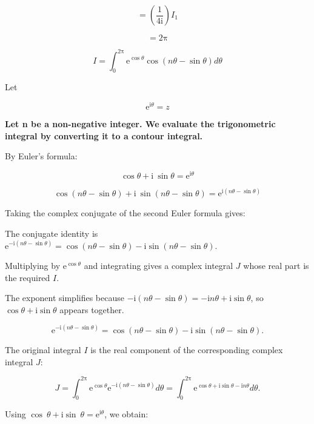 \documentclass[11pt,a4paper]{article}
\theoremstyle{definition}
\theoremstyle{plain}
\begin{document}
\[
= \left(\frac{1}{4\mathrm{i}}\right)I_{1}
\]

\[
= 2\mathrm{\pi}
\]

\[
I = \int_{0}^{2\mathrm{\pi}}\mathrm{e}^{\cos \theta}\cos(n\theta - \sin \theta)d\theta
\]

Let

\begin{equation}
\mathrm{e}^{\mathrm{i}\theta} = z
\end{equation}

\textbf{Let n be a non-negative integer. We evaluate the trigonometric integral by converting it to a contour integral.}

By Euler’s formula:

\begin{equation}
\cos \theta + \mathrm{i}\ \sin \theta = \mathrm{e}^{\mathrm{i}\theta}
\end{equation}

\[
\cos(n\theta - \sin \theta) + \mathrm{i}\ \sin(n\theta - \sin \theta) = \mathrm{e}^{\mathrm{i}(n\theta - \sin \theta)}
\]

Taking the complex conjugate of the second Euler formula gives:

The conjugate identity is $\mathrm{e}^{-\mathrm{i}(n\theta - \sin \theta)} = \cos(n\theta - \sin \theta) - \mathrm{i}\sin(n\theta - \sin \theta)$.

Multiplying by $\mathrm{e}^{\cos \theta}$ and integrating gives a complex integral $J$ whose real part is the required $I$.

The exponent simplifies because $-\mathrm{i}(n\theta - \sin \theta) = -\mathrm{i}n\theta + \mathrm{i}\sin \theta$, so $\cos \theta + \mathrm{i}\sin \theta$ appears together.

\begin{equation}
\mathrm{e}^{-\mathrm{i}(n\theta - \sin \theta)} = \cos(n\theta - \sin \theta) - \mathrm{i}\sin(n\theta - \sin \theta).
\end{equation}

The original integral $I$ is the real component of the corresponding complex integral $J$:

\begin{equation}
J = \int_{0}^{2\mathrm{\pi}}\mathrm{e}^{\cos \theta}\mathrm{e}^{-\mathrm{i}(n\theta - \sin \theta)} d\theta = \int_{0}^{2\mathrm{\pi}}\mathrm{e}^{\cos \theta + \mathrm{i}\sin \theta - \mathrm{i}n\theta} d\theta .
\end{equation}

Using $\cos \ \theta + \mathrm{i}\sin \ \theta = \mathrm{e}^{\mathrm{i}\theta}$, we obtain:
\end{document}

